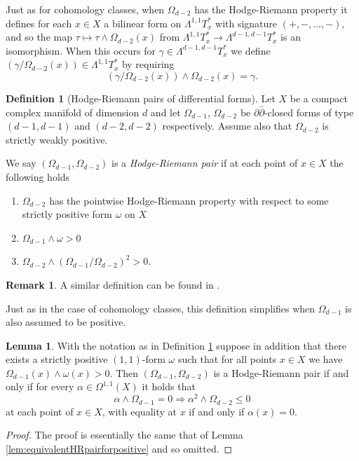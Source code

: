 \documentclass[a4,reqno]{amsart}
\theoremstyle{definition}
\newtheorem{definition}[theorem]{Definition}
\newtheorem{lemma}[theorem]{Lemma}
\newtheorem{remark}[theorem]{Remark}
\numberwithin{equation}{section}
\begin{document}
Just as for cohomology classes, when $\Omega_{d-2}$ has the Hodge-Riemann property it defines for each $x\in X$ a bilinear form on $\Lambda^{1,1}T^*_x$ with signature $(+,-,\ldots,-)$, and so the map $\tau \mapsto \tau \wedge \Omega_{d-2}(x)$ from $\Lambda^{1,1}T_x^*\to \Lambda^{d-1,d-1} T_x^*$ is an isomorphism.   When this occurs for $\gamma \in \Lambda^{d-1,d-1} T_x^*$ we define $(\gamma/\Omega_{d-2}(x))\in \Lambda^{1,1}T_x^*$ by requiring
$$(\gamma/\Omega_{d-2}(x)) \wedge \Omega_{d-2}(x) = \gamma.$$


\begin{definition}[Hodge-Riemann pairs of differential forms]\label{def:analyticHRpair}
    Let $X$ be a compact complex manifold of dimension $d$ and let $\Omega_{d-1}$, $\Omega_{d-2}$ be $\partial \bar{\partial}$-closed forms of type $(d-1,d-1)$ and $(d-2,d-2)$ respectively.   Assume also that $\Omega_{d-2}$ is strictly weakly positive.

    We say $(\Omega_{d-1},\Omega_{d-2})$ is a \textit{Hodge-Riemann pair} if at each point of $x\in X$ the following holds

    \begin{enumerate}
\item    $\Omega_{d-2}$ has the pointwise Hodge-Riemann property with respect to some  strictly  positive form $\omega$ on $X$
\item $\Omega_{d-1}\wedge \omega >0$
\item $\Omega_{d-2} \wedge (\Omega_{d-1}/\Omega_{d-2})^2>0$.
\end{enumerate}
\end{definition}

\begin{remark}
A similar definition can be found in \cite[Section 2]{ChenWentworth}.
\end{remark}

Just as in the case of cohomology classes, this definition simplifies when $\Omega_{d-1}$ is also assumed to be positive.

\begin{lemma}\label{lem:analyticequivalentHRpairforpositive}
With the notation as in Definition \ref{def:analyticHRpair} suppose in addition that there exists a strictly positive $(1,1)$-form $\omega$ such that for all points $x\in X$ we have
$\Omega_{d-1}(x) \wedge \omega(x)>0$. %
 Then $(\Omega_{d-1},\Omega_{d-2})$ is a Hodge-Riemann pair if and only if for every $\alpha\in \Omega^{1,1}(X)$ it holds that
 $$\alpha \wedge \Omega_{d-1} = 0 \Rightarrow \alpha^2 \wedge \Omega_{d-2} \le 0$$ 
    at each point of $x \in X$, with equality at $x$ if and only if $\alpha(x) = 0$.
\end{lemma}
\begin{proof}
The proof is essentially the same that of Lemma \ref{lem:equivalentHRpairforpositive} and so omitted.
\end{proof}
\end{document}
